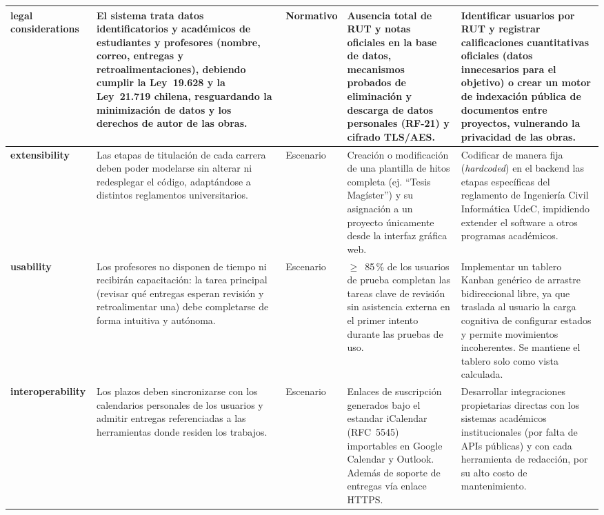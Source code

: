 \documentclass[10pt,a4paper]{article}
\begin{document}
\begin{xltabular}{\linewidth}{|P{2.4cm}|L|P{2.2cm}|P{3.0cm}|P{3.6cm}|}
\textbf{legal considerations} & El sistema trata datos identificatorios y académicos de estudiantes y profesores (nombre, correo, entregas y retroalimentaciones), debiendo cumplir la Ley~19.628 y la Ley~21.719 chilena, resguardando la minimización de datos y los derechos de autor de las obras. & Normativo & Ausencia total de RUT y notas oficiales en la base de datos, mecanismos probados de eliminación y descarga de datos personales (RF-21) y cifrado TLS/AES. & Identificar usuarios por RUT y registrar calificaciones cuantitativas oficiales (datos innecesarios para el objetivo) o crear un motor de indexación pública de documentos entre proyectos, vulnerando la privacidad de las obras. \\ \hline
\textbf{extensibility} & Las etapas de titulación de cada carrera deben poder modelarse sin alterar ni redesplegar el código, adaptándose a distintos reglamentos universitarios. & Escenario & Creación o modificación de una plantilla de hitos completa (ej. ``Tesis Magíster'') y su asignación a un proyecto únicamente desde la interfaz gráfica web. & Codificar de manera fija (\emph{hardcoded}) en el backend las etapas específicas del reglamento de Ingeniería Civil Informática UdeC, impidiendo extender el software a otros programas académicos. \\ \hline
\textbf{usability} & Los profesores no disponen de tiempo ni recibirán capacitación: la tarea principal (revisar qué entregas esperan revisión y retroalimentar una) debe completarse de forma intuitiva y autónoma. & Escenario & $\ge$~85\,\% de los usuarios de prueba completan las tareas clave de revisión sin asistencia externa en el primer intento durante las pruebas de uso. & Implementar un tablero Kanban genérico de arrastre bidireccional libre, ya que traslada al usuario la carga cognitiva de configurar estados y permite movimientos incoherentes. Se mantiene el tablero solo como vista calculada. \\ \hline
\textbf{interoperability} & Los plazos deben sincronizarse con los calendarios personales de los usuarios y admitir entregas referenciadas a las herramientas donde residen los trabajos. & Escenario & Enlaces de suscripción generados bajo el estandar iCalendar (RFC~5545) importables en Google Calendar y Outlook. Además de soporte de entregas vía enlace HTTPS. & Desarrollar integraciones propietarias directas con los sistemas académicos institucionales (por falta de APIs públicas) y con cada herramienta de redacción, por su alto costo de mantenimiento. \\ \hline
\end{xltabular}
\end{document}
